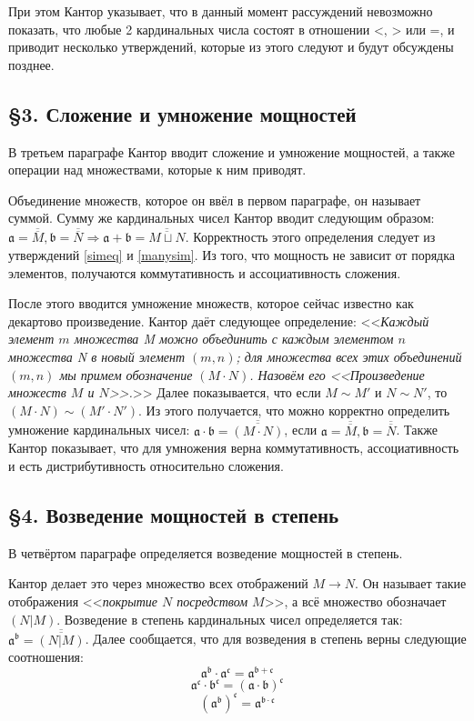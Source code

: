\documentclass[a4paper,12pt]{extarticle}
\theoremstyle{definition}
\newcommand{\cit}[1]{<<\textit{#1}>>}
\newcommand{\car}[1]{\overline{\overline{#1}}}
\begin{document}
При этом Кантор указывает, что в данный момент рассуждений невозможно показать, что любые 2 кардинальных числа состоят в отношении <, > или =,
и приводит несколько утверждений, которые из этого следуют и будут обсуждены позднее.

\subsection{\S 3. Сложение и умножение мощностей}
В третьем параграфе Кантор вводит сложение и умножение мощностей, а также операции над множествами, которые к ним приводят.

Объединение множеств, которое он ввёл в первом параграфе, он называет суммой.
Сумму же кардинальных чисел Кантор вводит следующим образом: $\mathfrak{a} = \car{M}, \mathfrak{b} = \car{N} \Rightarrow \mathfrak{a + b} = \car{M \sqcup N}$.
Корректность этого определения следует из утверждений \ref{simeq} и \ref{manysim}.
Из того, что мощность не зависит от порядка элементов, получаются коммутативность и ассоциативность сложения.

После этого вводится умножение множеств, которое сейчас известно как декартово произведение.
Кантор даёт следующее определение: \cit{Каждый элемент $m$ множества M можно объединить с каждым элементом $n$ множества N в новый элемент $(m, n)$;
для множества всех этих объединений $(m, n)$ мы примем обозначение $(M \cdot N)$. Назовём его <<\textnormal{Произведение множеств $M$ и $N$}>>.}
Далее показывается, что если $M \sim M'$ и $N \sim N'$, то $(M \cdot N) \sim (M' \cdot N')$.
Из этого получается, что можно корректно определить умножение кардинальных чисел: $\mathfrak{a \cdot b} = \car{(M \cdot N)}$, если $\mathfrak{a} = \car{M}, \mathfrak{b} = \car{N}$.
Также Кантор показывает, что для умножения верна коммутативность, ассоциативность и есть дистрибутивность относительно сложения.

\subsection{\S 4. Возведение мощностей в степень}
В четвёртом параграфе определяется возведение мощностей в степень.

Кантор делает это через множество всех отображений $M \rightarrow N$.
Он называет такие отображения \cit{покрытие $N$ посредством $M$}, а всё множество обозначает $(N|M)$.
Возведение в степень кардинальных чисел определяется так: $\mathfrak{a^b} = \car{(N|M)}$.
Далее сообщается, что для возведения в степень верны следующие соотношения:
$$\mathfrak{a^b \cdot a^c = a^{b+c}}$$
$$\mathfrak{a^c \cdot b^c = (a \cdot b)^c}$$
$$\mathfrak{(a^b)^c = a^{b \cdot c}}$$
\end{document}
